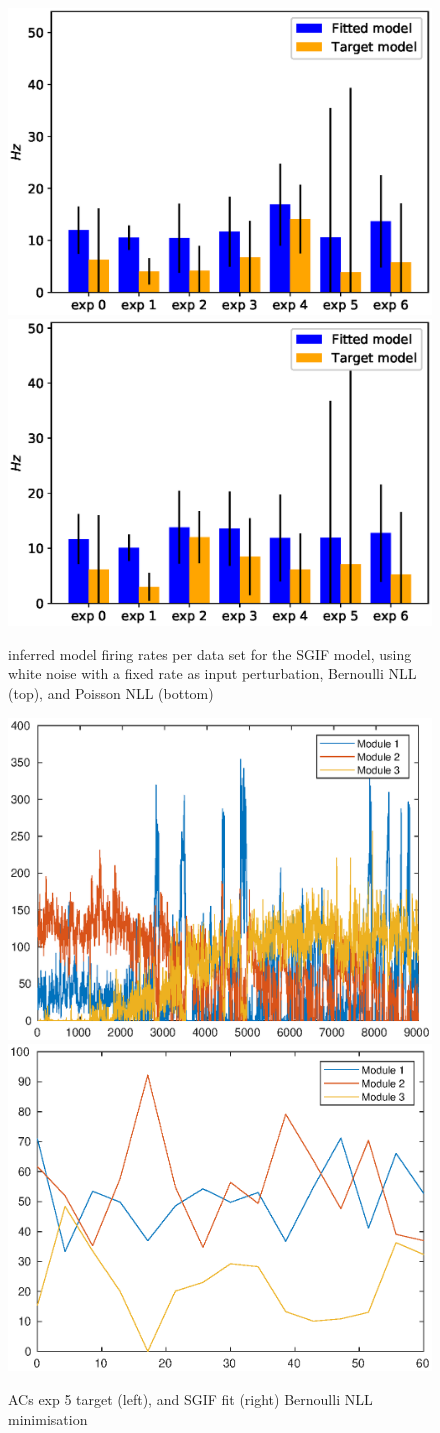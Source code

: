 \documentclass[mphil,deptreport,ianc]{infthesis} %
\begin{document}
\begin{figure}
    \centering
    \includegraphics[width=0.49\columnwidth]{figures/sleep/approx_rate_across_exp_microGIF_bernoulli_nll_vs_fitted.eps}
    \includegraphics[width=0.49\columnwidth]{figures/sleep/approx_rate_across_exp_microGIF_poisson_nll_vs_fitted.eps}
    \caption{inferred model firing rates per data set for the SGIF model, using white noise with a fixed rate as input perturbation, Bernoulli NLL (top), and Poisson NLL (bottom)}
    \label{fig:approx_rates_sleep_exps_SGIF}
\end{figure}



\begin{figure}
    \centering
    \includegraphics[width=0.49\columnwidth]{figures/sleep/ACs138.eps}
    \includegraphics[width=0.49\columnwidth]{figures/sleep/ACs_SGIF_exp5_fit_bernoulli_nll_2.eps}
    \caption{ACs exp 5 target (left), and SGIF fit (right) Bernoulli NLL minimisation}
    \label{fig:ACs_exp5}
\end{figure}
\end{document}

